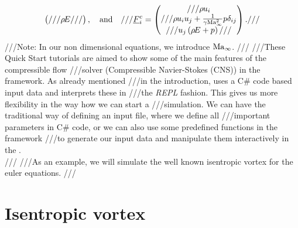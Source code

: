 {\begin{align*}
\begin{pmatrix}
///  \energy{}
///\end{pmatrix}, \quad \textrm{and} \quad
///\vec{F}^c_i = \begin{pmatrix}
///  \momentum_i\\
///  \momentum_i \velocity_j + \frac{1}{\heatCapacityRatio \reference{\Mach}^2}\pressure \delta_{ij}\\
///  \velocity_j \left(\energy{}+\pressure{}\right)
///\end{pmatrix}.
///\end{align*}
///Note: In our non dimensional equations, we introduce ${\mathrm{Ma}}_{\infty}$. 
///
///These Quick Start tutorials are aimed to show some of the main features of the compressible flow 
///solver (Compressible Navier-Stokes (CNS)) in the \BoSSS{} framework. As already mentioned 
///in the introduction, \BoSSS{} uses a C\# code based input data and interprets these in 
///the \emph{REPL} fashion. This gives us more flexibility in the way how we can start a 
///simulation. We can have the traditional way of defining an input file, where we define all 
///important parameters in C\# code, or we can also use some predefined functions in the framework 
///to generate our input data and manipulate them interactively in the \BoSSSpad{}.\\ 
///
///As an example, we will simulate the well known isentropic vortex for the euler equations. 
///\section{Isentropic vortex}
 }
\BoSSSexeSilent
{}
\BoSSSexeSilent
{}
\BoSSSexe
{}
\BoSSSexe
{}
\BoSSSexe
{}
\BoSSSexe
